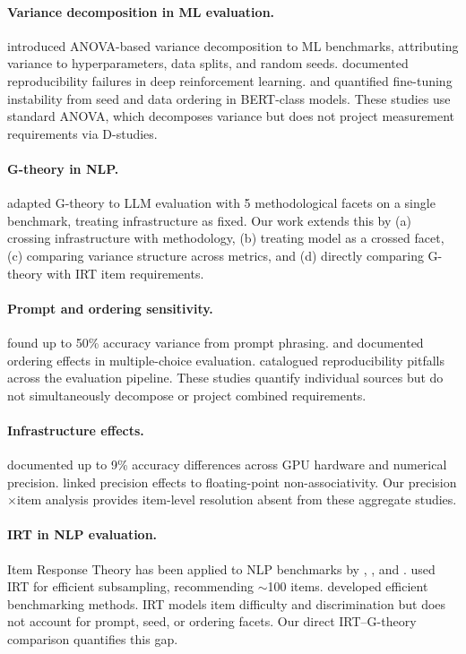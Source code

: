 \documentclass[letterpaper]{article}
\begin{document}
\paragraph{Variance decomposition in ML evaluation.}
\citet{bouthillier2021accounting} introduced ANOVA-based variance decomposition to ML benchmarks, attributing variance to hyperparameters, data splits, and random seeds. \citet{henderson2018deep} documented reproducibility failures in deep reinforcement learning. \citet{dodge2020fine} and \citet{sellam2022multibertsmultibert} quantified fine-tuning instability from seed and data ordering in BERT-class models. These studies use standard ANOVA, which decomposes variance but does not project measurement requirements via D-studies.

\paragraph{G-theory in NLP.}
\citet{mesting2026generalizability} adapted G-theory to LLM evaluation with 5 methodological facets on a single benchmark, treating infrastructure as fixed. Our work extends this by (a) crossing infrastructure with methodology, (b) treating model as a crossed facet, (c) comparing variance structure across metrics, and (d) directly comparing G-theory with IRT item requirements.

\paragraph{Prompt and ordering sensitivity.}
\citet{mizrahi2024state} found up to 50\% accuracy variance from prompt phrasing. \citet{lu2022fantastically} and \citet{pezeshkpour2024large} documented ordering effects in multiple-choice evaluation. \citet{biderman2024lessons} catalogued reproducibility pitfalls across the evaluation pipeline. These studies quantify individual sources but do not simultaneously decompose or project combined requirements.

\paragraph{Infrastructure effects.}
\citet{yuan2025llm} documented up to 9\% accuracy differences across GPU hardware and numerical precision. \citet{messina2026precision} linked precision effects to floating-point non-associativity. Our precision$\times$item analysis provides item-level resolution absent from these aggregate studies.

\paragraph{IRT in NLP evaluation.}
Item Response Theory has been applied to NLP benchmarks by \citet{lalor2019learning}, \citet{rodriguez2021evaluation}, and \citet{vania2021comparing}. \citet{polo2024tinybenchmarks} used IRT for efficient subsampling, recommending $\sim$100 items. \citet{perlitz2023efficient} developed efficient benchmarking methods. IRT models item difficulty and discrimination but does not account for prompt, seed, or ordering facets. Our direct IRT--G-theory comparison quantifies this gap.
\end{document}
